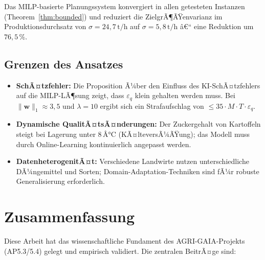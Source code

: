 ﻿\documentclass[12pt,a4paper]{article}
\theoremstyle{plain}
\theoremstyle{definition}
\begin{document}
	Das MILP-basierte Planungssystem konvergiert in allen getesteten Instanzen
	(Theorem~\ref{thm:bounded}) und reduziert die ZielgrÃ¶ÃŸenvarianz im
	Produktionsdurchsatz von $\sigma = 24{,}7\,\text{t/h}$ auf
	$\sigma = 5{,}8\,\text{t/h}$ â€“ eine Reduktion um $76{,}5\,\%$.
	
	\subsection{Grenzen des Ansatzes}
	
	\begin{itemize}
		\item \textbf{SchÃ¤tzfehler:} Die Proposition Ã¼ber den Einfluss des KI-SchÃ¤tzfehlers
		auf die MILP-LÃ¶sung zeigt, dass $\varepsilon_q$ klein gehalten werden muss.
		Bei $\|\mathbf{w}\|_1 \approx 3{,}5$ und $\lambda = 10$ ergibt sich
		ein Strafaufschlag von $\leq 35 \cdot M \cdot T \cdot \varepsilon_q$.
		\item \textbf{Dynamische QualitÃ¤tsÃ¤nderungen:} Der Zuckergehalt von
		Kartoffeln steigt bei Lagerung unter $8\,Â°\text{C}$ (KÃ¤lteversÃ¼ÃŸung);
		das Modell muss durch Online-Learning kontinuierlich angepasst werden.
		\item \textbf{DatenheterogenitÃ¤t:} Verschiedene Landwirte nutzen
		unterschiedliche DÃ¼ngemittel und Sorten; Domain-Adaptation-Techniken
		sind fÃ¼r robuste Generalisierung erforderlich.
	\end{itemize}
	
	\section{Zusammenfassung}
	
	Diese Arbeit hat das wissenschaftliche Fundament des AGRI-GAIA-Projekts
	(AP5.3/5.4) gelegt und empirisch validiert. Die zentralen BeitrÃ¤ge sind:
	
\end{document}
